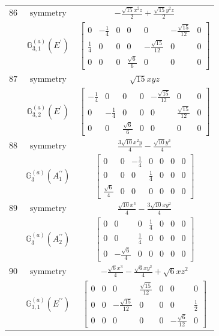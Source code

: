 \documentclass[fleqn,8pt,landscape]{jsarticle}
\begin{document}
\begin{longtable}{ccc}
$ 86 $ & $ \text{symmetry} $ & $ - \frac{\sqrt{15} x^{2} z}{2} + \frac{\sqrt{15} y^{2} z}{2} $ \\
$  $ & $ \mathbb{G}_{3,1}^{(a)}(E^{\prime}) $ & $ \begin{bmatrix} 0 & - \frac{1}{4} & 0 & 0 & 0 & - \frac{\sqrt{15}}{12} & 0 \\ \frac{1}{4} & 0 & 0 & 0 & - \frac{\sqrt{15}}{12} & 0 & 0 \\ 0 & 0 & 0 & \frac{\sqrt{6}}{6} & 0 & 0 & 0 \end{bmatrix} $ \\ \hline
$ 87 $ & $ \text{symmetry} $ & $ \sqrt{15} x y z $ \\
$  $ & $ \mathbb{G}_{3,2}^{(a)}(E^{\prime}) $ & $ \begin{bmatrix} - \frac{1}{4} & 0 & 0 & 0 & - \frac{\sqrt{15}}{12} & 0 & 0 \\ 0 & - \frac{1}{4} & 0 & 0 & 0 & \frac{\sqrt{15}}{12} & 0 \\ 0 & 0 & \frac{\sqrt{6}}{6} & 0 & 0 & 0 & 0 \end{bmatrix} $ \\ \hline
$ 88 $ & $ \text{symmetry} $ & $ \frac{3 \sqrt{10} x^{2} y}{4} - \frac{\sqrt{10} y^{3}}{4} $ \\
$  $ & $ \mathbb{G}_{3}^{(a)}(A_{1}^{\prime\prime}) $ & $ \begin{bmatrix} 0 & 0 & - \frac{1}{4} & 0 & 0 & 0 & 0 \\ 0 & 0 & 0 & \frac{1}{4} & 0 & 0 & 0 \\ \frac{\sqrt{6}}{4} & 0 & 0 & 0 & 0 & 0 & 0 \end{bmatrix} $ \\ \hline
$ 89 $ & $ \text{symmetry} $ & $ \frac{\sqrt{10} x^{3}}{4} - \frac{3 \sqrt{10} x y^{2}}{4} $ \\
$  $ & $ \mathbb{G}_{3}^{(a)}(A_{2}^{\prime\prime}) $ & $ \begin{bmatrix} 0 & 0 & 0 & \frac{1}{4} & 0 & 0 & 0 \\ 0 & 0 & \frac{1}{4} & 0 & 0 & 0 & 0 \\ 0 & - \frac{\sqrt{6}}{4} & 0 & 0 & 0 & 0 & 0 \end{bmatrix} $ \\ \hline
$ 90 $ & $ \text{symmetry} $ & $ - \frac{\sqrt{6} x^{3}}{4} - \frac{\sqrt{6} x y^{2}}{4} + \sqrt{6} x z^{2} $ \\
$  $ & $ \mathbb{G}_{3,1}^{(a)}(E^{\prime\prime}) $ & $ \begin{bmatrix} 0 & 0 & 0 & \frac{\sqrt{15}}{12} & 0 & 0 & 0 \\ 0 & 0 & - \frac{\sqrt{15}}{12} & 0 & 0 & 0 & \frac{1}{2} \\ 0 & 0 & 0 & 0 & 0 & - \frac{\sqrt{6}}{12} & 0 \end{bmatrix} $ \\ \hline

\end{longtable}
\end{document}
